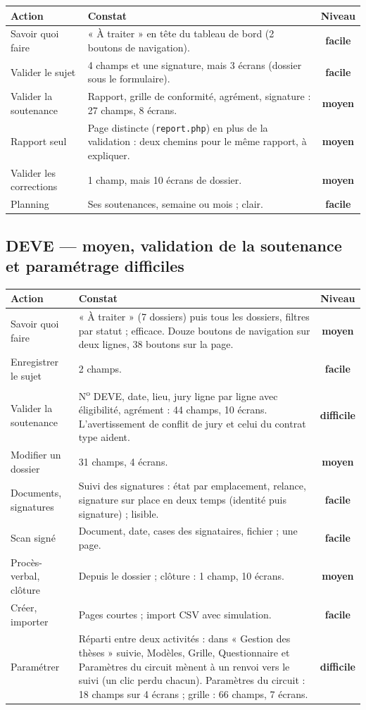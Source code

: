\documentclass[11pt,a4paper]{article}
\newcommand{\code}[1]{\texttt{#1}}
\newcommand{\facile}{\textcolor{green!45!black}{\textbf{facile}}}
\newcommand{\moyen}{\textcolor{orange!80!black}{\textbf{moyen}}}
\newcommand{\difficile}{\textcolor{red!70!black}{\textbf{difficile}}}
\begin{document}
\begin{tabularx}{\linewidth}{@{}l Y c@{}}
\toprule
\textbf{Action} & \textbf{Constat} & \textbf{Niveau} \\
\midrule
Savoir quoi faire & « À traiter » en tête du tableau de bord (2 boutons de navigation). & \facile \\
Valider le sujet & 4 champs et une signature, mais 3 écrans (dossier sous le formulaire). & \facile \\
Valider la soutenance & Rapport, grille de conformité, agrément, signature : 27 champs, 8 écrans. & \moyen \\
Rapport seul & Page distincte (\code{report.php}) en plus de la validation : deux chemins pour le
  même rapport, à expliquer. & \moyen \\
Valider les corrections & 1 champ, mais 10 écrans de dossier. & \moyen \\
Planning & Ses soutenances, semaine ou mois ; clair. & \facile \\
\bottomrule
\end{tabularx}

\subsection{DEVE --- moyen, validation de la soutenance et paramétrage difficiles}

\begin{tabularx}{\linewidth}{@{}l Y c@{}}
\toprule
\textbf{Action} & \textbf{Constat} & \textbf{Niveau} \\
\midrule
Savoir quoi faire & « À traiter » (7 dossiers) puis tous les dossiers, filtres par statut ;
  efficace. Douze boutons de navigation sur deux lignes, 38 boutons sur la page. & \moyen \\
Enregistrer le sujet & 2 champs. & \facile \\
Valider la soutenance & N\textsuperscript{o} DEVE, date, lieu, jury ligne par ligne avec
  éligibilité, agrément : 44 champs, 10 écrans. L'avertissement de conflit de jury et celui du
  contrat type aident. & \difficile \\
Modifier un dossier & 31 champs, 4 écrans. & \moyen \\
Documents, signatures & Suivi des signatures : état par emplacement, relance, signature sur
  place en deux temps (identité puis signature) ; lisible. & \facile \\
Scan signé & Document, date, cases des signataires, fichier ; une page. & \facile \\
Procès-verbal, clôture & Depuis le dossier ; clôture : 1 champ, 10 écrans. & \moyen \\
Créer, importer & Pages courtes ; import CSV avec simulation. & \facile \\
Paramétrer & Réparti entre deux activités : dans « Gestion des thèses » suivie, Modèles,
  Grille, Questionnaire et Paramètres du circuit mènent à un renvoi vers le suivi (un clic
  perdu chacun). Paramètres du circuit : 18 champs sur 4 écrans ; grille : 66 champs, 7 écrans. & \difficile \\
\bottomrule
\end{tabularx}
\end{document}
